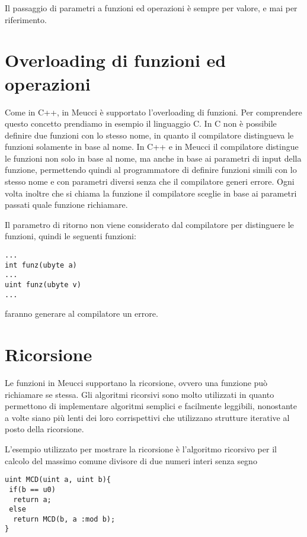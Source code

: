 \documentclass[10pt]{book}%
\newcommand{\e}{\`{e} }
\newcommand{\ac}[1]{\`{#1}}
\newenvironment{codeenv}{
\begin{mdframed}[backgroundcolor=black!20,topline=false,leftline=false,rightline=false,bottomline=false]
}
{\end{mdframed}}
\begin{document}
Il passaggio di parametri a funzioni ed operazioni \e sempre per valore, e mai per riferimento.

\section{Overloading di funzioni ed operazioni}
Come in C++, in Meucci \e supportato l'overloading di funzioni. Per comprendere questo concetto prendiamo in esempio il linguaggio C. In C non \e possibile definire due funzioni con lo stesso nome, in quanto il compilatore distingueva le funzioni solamente in base al nome. In C++ e in Meucci il compilatore distingue le funzioni non solo in base al nome, ma anche in base ai parametri di input della funzione, permettendo quindi al programmatore di definire funzioni simili con lo stesso nome e con parametri diversi senza che il compilatore generi errore. Ogni volta inoltre che si chiama la funzione il compilatore sceglie in base ai  parametri passati quale funzione richiamare.

Il parametro di ritorno non viene considerato dal compilatore per distinguere le funzioni, quindi le seguenti funzioni:
\begin{codeenv}
\begin{verbatim}
...
int funz(ubyte a)
...
uint funz(ubyte v)
...
\end{verbatim}
\end{codeenv}
faranno generare al compilatore un errore.

\section{Ricorsione}
Le funzioni in Meucci supportano la ricorsione, ovvero una funzione pu\ac o richiamare se stessa. Gli algoritmi ricorsivi sono molto utilizzati in quanto permettono di implementare algoritmi semplici e facilmente leggibili, nonostante a volte siano pi\ac u lenti dei loro corrispettivi che utilizzano strutture iterative al posto della ricorsione.

L'esempio utilizzato per mostrare la ricorsione \e l'algoritmo ricorsivo per il calcolo del massimo comune divisore di due numeri interi senza segno
\begin{codeenv}
\begin{verbatim}
uint MCD(uint a, uint b){
 if(b == u0)
  return a;
 else
  return MCD(b, a :mod b);
}
\end{verbatim}
\end{codeenv}
\end{document}
